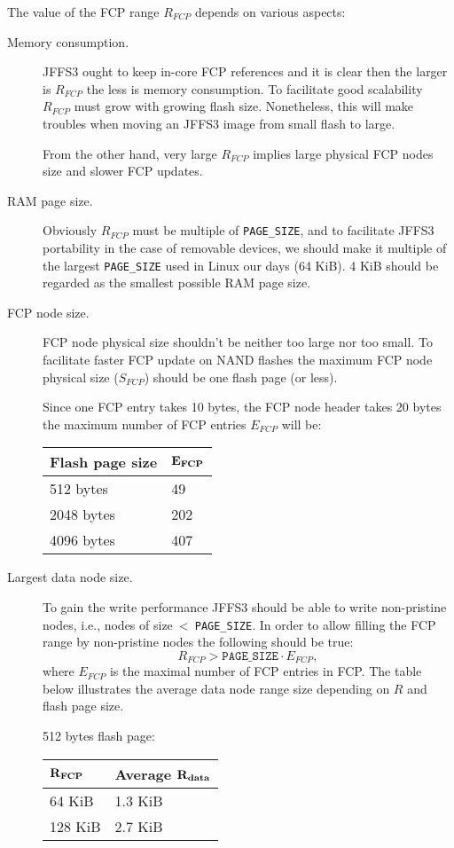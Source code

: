 \documentclass[12pt,a4paper,oneside,titlepage]{article}
\begin{document}
The value of the FCP range $R_{FCP}$ depends on various aspects:
\begin{description} 
\item[Memory consumption.] JFFS3 ought to keep in-core FCP references
and it is clear then the larger is $R_{FCP}$ the less is memory
consumption. To facilitate good scalability $R_{FCP}$ must grow with growing
flash size. Nonetheless, this will make troubles when moving an JFFS3
image from small flash to large.

From the other hand, very large $R_{FCP}$ implies large physical
FCP nodes size and slower FCP updates.

\item[RAM page size.] Obviously $R_{FCP}$ must be multiple of
\texttt{PAGE\_SIZE}, and to facilitate JFFS3 portability in the case of
removable devices, we should
make it multiple of the largest \texttt{PAGE\_SIZE}
used in Linux our days (64 KiB). 4 KiB should be regarded as the smallest possible
RAM page size.

\item[FCP node size.] FCP node physical size shouldn't be
neither too large nor too small. To facilitate faster FCP update on NAND
flashes the maximum FCP node physical size ($S_{FCP}$) should be one
flash page (or less).

Since one FCP entry takes 10 bytes, the FCP node header takes 20 bytes
the maximum number of FCP entries $E_{FCP}$ will be:
\begin{center}
\begin{tabular}{ll}
\textbf{Flash page size} & $\bf E_{FCP}$ \\
\hline
512 bytes  & 49\\
2048 bytes & 202\\
4096 bytes & 407\\
\end{tabular}
\end{center}

\item[Largest data node size.] To gain the write performance JFFS3 should be
able to write non-pristine nodes, i.e., nodes of
\mbox{size < \texttt{PAGE\_SIZE}}. In order to allow filling the FCP range by
non-pristine nodes the following should be true:
$$R_{FCP} > \mathtt{PAGE\_SIZE}{\cdot}E_{FCP},$$
where $E_{FCP}$ is the
maximal number of FCP entries in FCP. The table below illustrates
the average data node range size depending on $R$ and flash page size.

512 bytes flash page:
\begin{center}
\begin{tabular}{ll}
$\bf R_{FCP}$ & \textbf{Average $\bf R_{data}$}\\
\hline
64 KiB  & 1.3 KiB\\
128 KiB & 2.7 KiB\\
\end{tabular}
\end{center}


\end{description}
\end{document}
